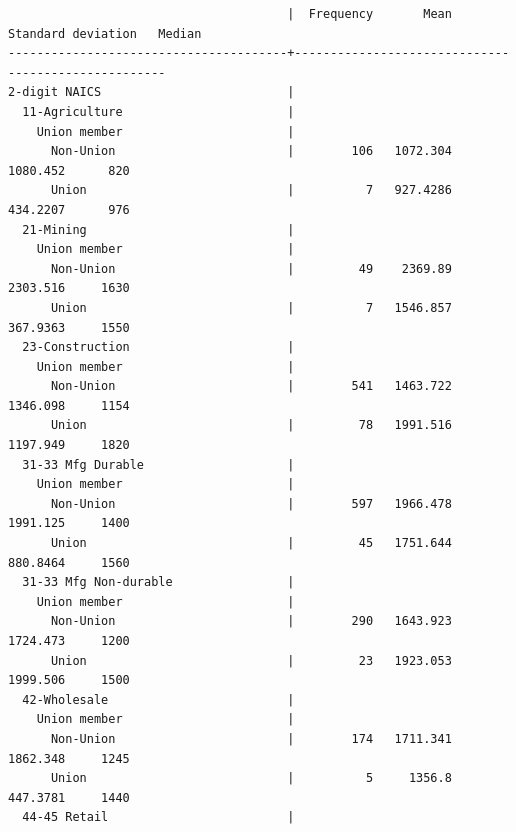 \documentclass[
]{book}
\begin{document}
\begin{verbatim}
                                       |  Frequency       Mean   Standard deviation   Median
---------------------------------------+----------------------------------------------------
2-digit NAICS                          |                                                    
  11-Agriculture                       |                                                    
    Union member                       |                                                    
      Non-Union                        |        106   1072.304             1080.452      820
      Union                            |          7   927.4286             434.2207      976
  21-Mining                            |                                                    
    Union member                       |                                                    
      Non-Union                        |         49    2369.89             2303.516     1630
      Union                            |          7   1546.857             367.9363     1550
  23-Construction                      |                                                    
    Union member                       |                                                    
      Non-Union                        |        541   1463.722             1346.098     1154
      Union                            |         78   1991.516             1197.949     1820
  31-33 Mfg Durable                    |                                                    
    Union member                       |                                                    
      Non-Union                        |        597   1966.478             1991.125     1400
      Union                            |         45   1751.644             880.8464     1560
  31-33 Mfg Non-durable                |                                                    
    Union member                       |                                                    
      Non-Union                        |        290   1643.923             1724.473     1200
      Union                            |         23   1923.053             1999.506     1500
  42-Wholesale                         |                                                    
    Union member                       |                                                    
      Non-Union                        |        174   1711.341             1862.348     1245
      Union                            |          5     1356.8             447.3781     1440
  44-45 Retail                         |                                                    

\end{verbatim}
\end{document}
